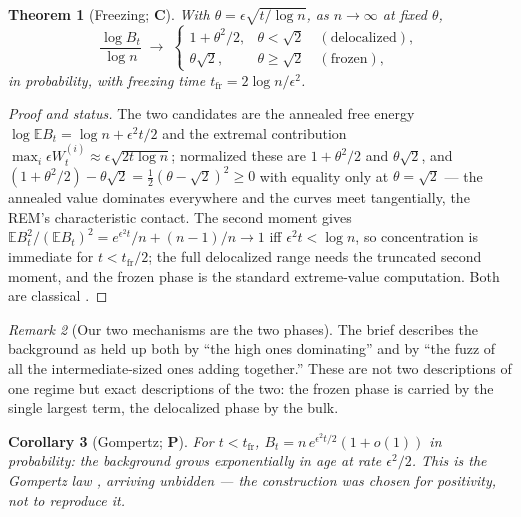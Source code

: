 \documentclass[11pt]{article}
\numberwithin{equation}{section}
\theoremstyle{plain}
\newtheorem{theorem}{Theorem}[section]
\newtheorem{corollary}[theorem]{Corollary}
\theoremstyle{definition}
\theoremstyle{remark}
\newtheorem{remark}[theorem]{Remark}
\newcommand{\E}{\mathbb{E}}
\begin{document}
\begin{theorem}[Freezing; \textbf{C}]\label{tc:thm:freezing}
With $\theta=\epsilon\sqrt{t/\log n}$, as $n\to\infty$ at fixed
$\theta$,
\begin{equation}\label{tc:eq:freezing}
\frac{\log B_t}{\log n}\;\longrightarrow\;
\begin{cases}
1+\theta^{2}/2, & \theta<\sqrt2\quad(\text{delocalized}),\\
\theta\sqrt2, & \theta\ge\sqrt2\quad(\text{frozen}),
\end{cases}
\end{equation}
in probability, with freezing time
$t_{\mathrm{fr}}=2\log n/\epsilon^{2}$.
\end{theorem}

\begin{proof}[Proof and status]
The two candidates are the annealed free energy
$\log\E B_t=\log n+\epsilon^{2}t/2$ and the extremal contribution
$\max_i\epsilon W^{(i)}_t\approx\epsilon\sqrt{2t\log n}$; normalized
these are $1+\theta^{2}/2$ and $\theta\sqrt2$, and
$(1+\theta^{2}/2)-\theta\sqrt2=\tfrac12(\theta-\sqrt2)^{2}\ge0$ with
equality only at $\theta=\sqrt2$ --- the annealed value dominates
everywhere and the curves meet tangentially, the REM's characteristic
contact. The second moment gives
$\E B_t^{2}/(\E B_t)^{2}=e^{\epsilon^{2}t}/n+(n-1)/n\to1$ iff
$\epsilon^{2}t<\log n$, so concentration is immediate for
$t<t_{\mathrm{fr}}/2$; the full delocalized range needs the truncated
second moment, and the frozen phase is the standard extreme-value
computation. Both are classical \cite{Der81,Bov06,BBM05}.
\end{proof}

\begin{remark}[Our two mechanisms are the two phases]
\label{tc:rem:twophases}
The brief describes the background as held up both by ``the high ones
dominating'' and by ``the fuzz of all the intermediate-sized ones adding
together.'' These are not two descriptions of one regime but exact
descriptions of the two: the frozen phase is carried by the single
largest term, the delocalized phase by the bulk.
\end{remark}

\begin{corollary}[Gompertz; \textbf{P}]\label{tc:cor:gompertz}
For $t<t_{\mathrm{fr}}$, $B_t=n\,e^{\epsilon^{2}t/2}(1+o(1))$ in
probability: the background grows exponentially in age at rate
$\epsilon^{2}/2$. This is the Gompertz law \cite{Gom25}, arriving
unbidden --- the construction was chosen for positivity, not to
reproduce it.
\end{corollary}
\end{document}
